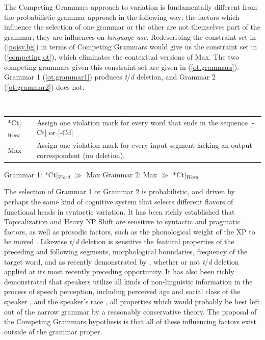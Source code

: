 The Competing Grammars approach to variation is fundamentally different from the probabilistic grammar approach in the following way: the factors which influence the selection of one grammar or the other are not themselves part of the grammar; they are influences on \textsl{language use}.
Redescribing the constraint set in (\ref{noisy.hg}) in terms of Competing Grammars would give us the constraint set in (\ref{competing.ot}), which eliminates the contextual versions of {\sc Max}.
The two competing grammars given this constraint set are given in (\ref{ot.grammars}).
Grammar 1 (\ref{ot.grammar1}) produces {\sl t}/{\sl d} deletion, and Grammar 2 (\ref{ot.grammar2}) does not.
\begin{exe}
	\ex \label{competing.ot}\ \\
	\begin{tabular}{lp{3in}}
	*{\sc Ct}]$_{Word}$& Assign one violation mark for every word that ends in the sequence [-Ct] or [-Cd]\\
	{\sc Max} & Assign one violation mark for every input segment lacking an output correspondent (no deletion).
	\end{tabular}
	\ex \label{ot.grammars}
		\begin{xlist}
			\ex Grammar 1: *{\sc Ct}]$_{Word}$ $\gg$ {\sc Max} \label{ot.grammar1}
			\ex Grammar 2: {\sc Max} $\gg$ *{\sc Ct}]$_{Word}$ \label{ot.grammar2}
		\end{xlist}
\end{exe}

The selection of Grammar 1 or Grammar 2 is probabilistic, and driven by perhaps the same kind of cognitive system that selects different flavors of functional heads in syntactic variation.
It has been richly established that Topicalization and Heavy NP Shift are sensitive to syntactic and pragmatic factors, as well as prosodic factors, such as the phonological weight of the XP to be moved \citep[e.g.][]{arnoldetal2000, speyer2008, speyer2010, wallenberg2012}. %
Likewise {\sl t}/{\sl d} deletion is sensitive the featural properties of the preceding and following segments, morphological boundaries, frequency of the target word, and as recently demonstrated by \citet{MacKenzie.Tamminga2012, tamminga2014}, whether or not {\sl t}/{\sl d} deletion applied at its most recently preceding opportunity. 
It has also been richly demonstrated that speakers utilize all kinds of non-linguistic information in the process of speech perception, including perceived age and social class of the speaker \citep{Hay2006}, and the speaker's race \citep{StaumCasasanto2010}, all properties which would probably be best left out of the narrow grammar by a reasonably conservative theory.
The proposal of the Competing Grammars hypothesis is that all of these influencing factors exist outside of the grammar proper.

